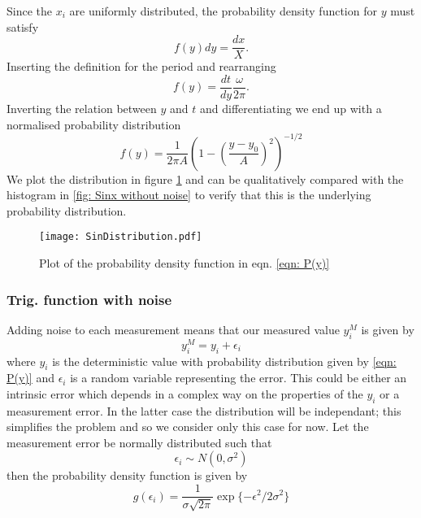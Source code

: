 \documentclass[/home/greg/Thesis/main/main.tex]{subfiles}
\begin{document}
Since the $x_i$ are uniformly distributed, the probability density function for
$y$ must satisfy
\begin{equation}
    f(y)dy = \frac{dx}{X}.
\end{equation}
Inserting the definition for the period and rearranging
\begin{equation}
    f(y) = \frac{dt}{dy} \frac{\omega}{2\pi}.
\end{equation}
Inverting the relation between $y$ and $t$ and differentiating we end up with a 
normalised probability distribution
\begin{equation}
    f(y) = \frac{1}{2\pi A} \left(1 - \left(\frac{y - y_{0}}{A}\right)^{2}\right)^{-1/2}
    \label{eqn: P(y)}
\end{equation}
We plot the distribution in figure \ref{fig: SinDistribution} and can be qualitatively
compared with the histogram in \ref{fig: Sinx without noise} to verify that this
is the underlying probability distribution.
\begin{figure}[htb]
    \centering
    \texttt{[image: SinDistribution.pdf]}
    \caption{Plot of the probability density function in eqn. \eqref{eqn: P(y)}}
    \label{fig: SinDistribution}
\end{figure}

\subsubsection{Trig. function with noise}
Adding noise to each measurement means that our measured value $y_{i}^{M}$ is
given by 
\begin{equation}
    y_{i}^{M} = y_{i} + \epsilon_{i}
\end{equation}
where $y_{i}$ is the deterministic value with probability distribution given by
\eqref{eqn: P(y)} and $\epsilon_{i}$ is a random variable representing the 
error. This could be either an intrinsic error which depends in a complex
way on the properties of the $y_{i}$ or a measurement
error. In the latter case the distribution will be independant; this simplifies
the problem and so we consider only this case for now. Let the measurement error
be normally distributed such that
\begin{equation}
    \epsilon_{i} \sim N(0, \sigma^{2})
\end{equation}
then the probability density function is given by 
\begin{equation}
    g(\epsilon_{i}) = \frac{1}{\sigma\sqrt{2\pi}} \exp\{-\epsilon^{2}/2\sigma^{2}\}
\end{equation}
\end{document}
